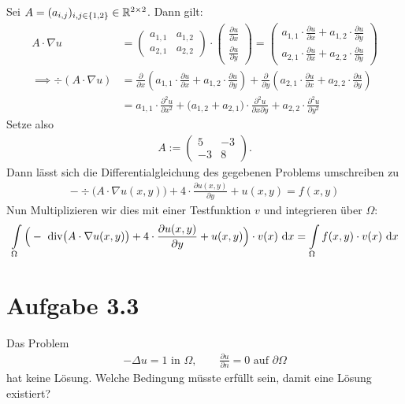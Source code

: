 \documentclass[12pt,a4paper]{article}
\begin{document}
\begin{lösung}
Sei $A=(a_{i,j})_{i,j\in\lbrace1,2\rbrace}\in\mathbb{R}^{2\times 2}$. Dann gilt:
\begin{align*}
A\cdot\nabla u&=\begin{pmatrix}
 a_{1,1} & a_{1,2}\\
 a_{2,1} & a_{2,2}
\end{pmatrix}\cdot\begin{pmatrix}
\frac{\partial u}{\partial x}\\
\frac{\partial u}{\partial y}
\end{pmatrix}=\begin{pmatrix}
a_{1,1}\cdot\frac{\partial u}{\partial x}+a_{1,2}\cdot\frac{\partial u}{\partial y}\\
a_{2,1}\cdot\frac{\partial u}{\partial x}+a_{2,2}\cdot\frac{\partial u}{\partial y}
\end{pmatrix}\\
\implies
\div(A\cdot\nabla u)&=\frac{\partial}{\partial x}\left(a_{1,1}\cdot\frac{\partial u}{\partial x}+a_{1,2}\cdot\frac{\partial u}{\partial y}\right)+\frac{\partial}{\partial y}\left(a_{2,1}\cdot\frac{\partial u}{\partial x}+a_{2,2}\cdot\frac{\partial u}{\partial y}\right)\\
&=a_{1,1}\cdot\frac{\partial^2 u}{\partial x^2}+\big(a_{1,2}+a_{2,1}\big)\cdot\frac{\partial^2 u}{\partial x\partial y}+a_{2,2}\cdot\frac{\partial^2 u}{\partial y^2}
\end{align*}
Setze also 
\begin{align*}
A:=\begin{pmatrix}
5 & -3\\
-3 & 8
\end{pmatrix}.
\end{align*}
Dann lässt sich die Differentialgleichung des gegebenen Problems umschreiben zu 
\begin{align*}
-\div\big(A\cdot\nabla u(x,y)\big)+4\cdot\frac{\partial u(x,y)}{\partial y}+u(x,y)=f(x,y)
\end{align*}
Nun Multiplizieren wir dies mit einer Testfunktion $v$ und integrieren über $\Omega$:
\begin{align*}
\int\limits_\Omega\Big(-\text{ div}\big(A\cdot\nabla u(x,y)\big)+4\cdot\frac{\partial u(x,y)}{\partial y}+u(x,y)\Big)\cdot v(x)\text{ d} x=\int\limits_\Omega f(x,y)\cdot v(x)\text{ d} x
\end{align*}
\end{lösung}

\section*{Aufgabe 3.3}
Das Problem 
\begin{align*}
-\Delta u=1\text{ in }\Omega,\qquad\frac{\partial u}{\partial n}=0\text{ auf }\partial\Omega
\end{align*}
hat keine Lösung. Welche Bedingung müsste erfüllt sein, damit eine Lösung existiert?
\end{document}
